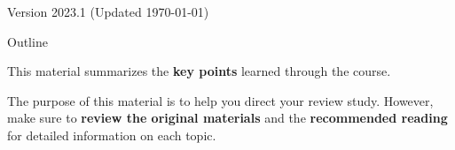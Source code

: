 \documentclass[aspectratio=169]{beamer}
\subtitle[Course Review]{Review 02 - Course Review}
\date{}
\begin{document}
\begin{frame}
  \maketitle

  \vfill

  \hfill \tiny{Version 2023.1 (Updated \today)}
\end{frame}

\begin{frame}[t]{Outline}

  This material summarizes the {\bf key points}
  learned through the course.\bigskip

  The purpose of this material is to help you direct your review study. However, make sure to {\bf review the original materials} and the {\bf recommended reading} for detailed information on each topic.

\end{frame}











\end{document}
